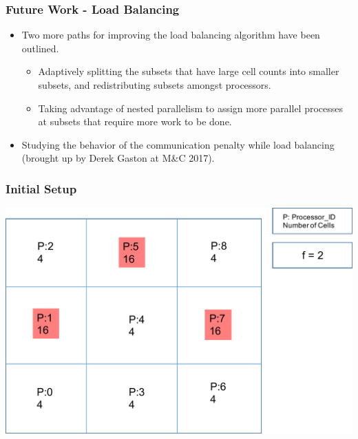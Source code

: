\documentclass[compress]{beamer}
\begin{document}
\begin{frame}[t]\frametitle{Future Work - Load Balancing}
\begin{block}{}
\begin{itemize}
\item Two more paths for improving the load balancing algorithm have been outlined.
\begin{itemize} 
\item Adaptively splitting the subsets that have large cell counts into smaller subsets, and redistributing subsets amongst processors.
\item Taking advantage of nested parallelism to assign more parallel processes at subsets that require more work to be done.
\end{itemize}
\item Studying the behavior of the communication penalty while load balancing (brought up by Derek Gaston at M\&C 2017).
\end{itemize}
\end{block}
\end{frame}

\begin{frame}[t]\frametitle{Initial Setup}
\centering
\includegraphics[scale=0.5]{figures/initial_setup.pdf}
\end{frame}
\end{document}
